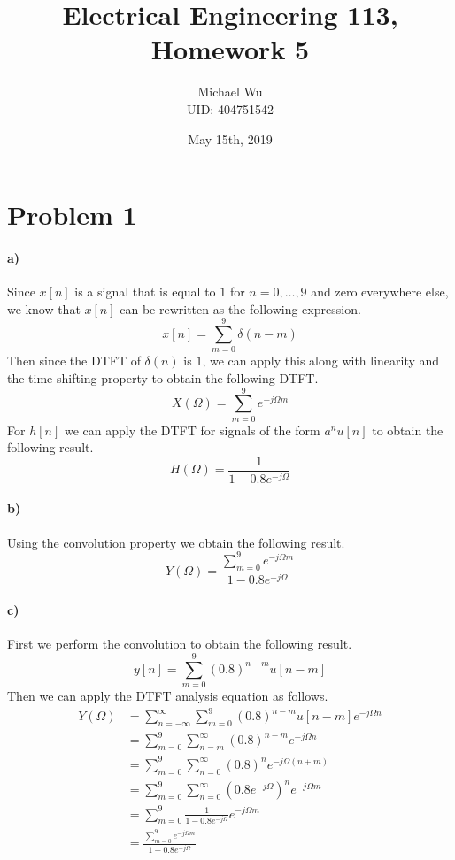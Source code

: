 \documentclass[12pt]{article}
\begin{document}
\title{Electrical Engineering 113, Homework 5}
\date{May 15th, 2019}
\author{Michael Wu\\UID: 404751542}
\maketitle

\section*{Problem 1}

\paragraph{a)}

Since \(x[n]\) is a signal that is equal to \(1\) for \(n=0,\ldots,9\) and zero everywhere else,
we know that \(x[n]\) can be rewritten as the following expression.
\[x[n]=\sum_{m=0}^9 \delta(n-m)\]
Then since the DTFT of \(\delta(n)\) is \(1\), we can apply this along with linearity and the time
shifting property to obtain the following DTFT.
\[X(\Omega)=\sum_{m=0}^9 e^{-j\Omega m}\]
For \(h[n]\) we can apply the DTFT for signals of the form \(a^nu[n]\) to obtain the following result.
\[H(\Omega)=\frac{1}{1-0.8e^{-j\Omega}}\]

\paragraph{b)}

Using the convolution property we obtain the following result.
\[Y(\Omega)=\frac{\sum_{m=0}^9 e^{-j\Omega m}}{1-0.8e^{-j\Omega}}\]

\paragraph{c)}

First we perform the convolution to obtain the following result.
\[y[n]=\sum_{m=0}^9 (0.8)^{n-m}u[n-m]\]
Then we can apply the DTFT analysis equation as follows.
\begin{align*}
    Y(\Omega)&=\sum_{n=-\infty}^\infty \sum_{m=0}^9 (0.8)^{n-m}u[n-m] e^{-j\Omega n}\\
    &=\sum_{m=0}^9 \sum_{n=m}^\infty (0.8)^{n-m} e^{-j\Omega n}\\
    &=\sum_{m=0}^9 \sum_{n=0}^\infty (0.8)^{n} e^{-j\Omega (n+m)}\\
    &=\sum_{m=0}^9 \sum_{n=0}^\infty \left(0.8e^{-j\Omega}\right)^n e^{-j\Omega m}\\
    &=\sum_{m=0}^9 \frac{1}{1-0.8e^{-j\Omega}} e^{-j\Omega m}\\
    &=\frac{\sum_{m=0}^9 e^{-j\Omega m}}{1-0.8e^{-j\Omega}}
\end{align*}
\end{document}
